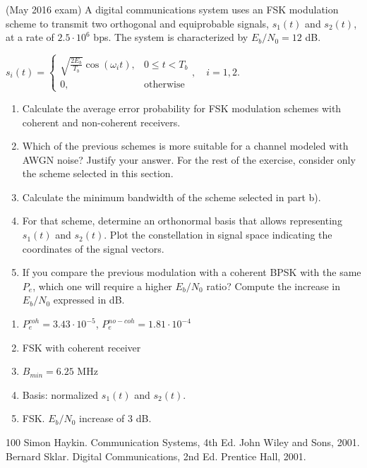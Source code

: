 \documentclass[es,boletin]{uah}
\begin{document}
{
(May 2016 exam) A digital communications system uses an FSK modulation scheme to transmit two orthogonal and equiprobable signals, $s_1(t)$ and $s_2(t)$, at a rate of $2.5\cdot 10^6$ bps. The system is characterized by $E_b/N_0 = 12$ dB.

$s_i (t) = \begin{cases} \sqrt{\frac{2E_b}{T_b}} \cos(\omega_i t), & 0 \leq t < T_b \\ 0, & \text{otherwise} \end{cases}, \quad i = 1,2.$

\begin{enumerate}
	\item Calculate the average error probability for FSK modulation schemes with coherent and non-coherent receivers.
	\item Which of the previous schemes is more suitable for a channel modeled with AWGN noise? Justify your answer. For the rest of the exercise, consider only the scheme selected in this section.
	\item Calculate the minimum bandwidth of the scheme selected in part b).
	\item For that scheme, determine an orthonormal basis that allows representing $s_1(t)$ and $s_2(t)$. Plot the constellation in signal space indicating the coordinates of the signal vectors.
	\item If you compare the previous modulation with a coherent BPSK with the same $P_e$, which one will require a higher $E_b/N_0$ ratio? Compute the increase in $E_b/N_0$ expressed in dB.
\end{enumerate}	
}
{
\begin{enumerate}
	\item $P_e^{coh} = 3.43 \cdot 10^{-5}$, $P_e^{no-coh} = 1.81 \cdot 10^{-4}$
	\item FSK with coherent receiver
	\item $B_{min} = 6.25$ MHz
	\item Basis: normalized $s_1(t)$ and $s_2(t)$. 
	\item FSK. $E_b/N_0$ increase of $3$ dB.
\end{enumerate}
}


\begin{thebibliography}{100}
	  Simon Haykin. Communication Systems, 4th Ed. John Wiley and Sons, 2001.
	 Bernard Sklar. Digital Communications, 2nd Ed. Prentice Hall, 2001.
	\end{thebibliography}
\end{document}
